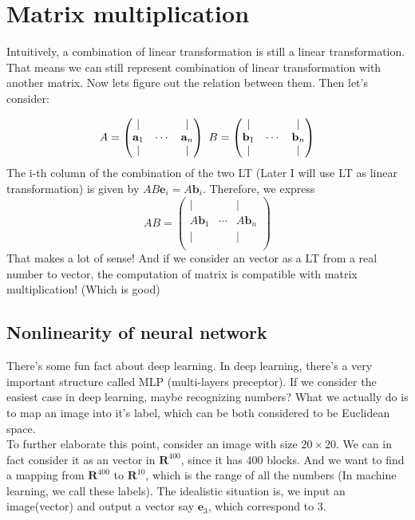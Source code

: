 \section{Matrix multiplication}
Intuitively, a combination of linear transformation is still a linear transformation. That means we can still represent combination of linear transformation with another matrix. Now lets figure out the relation between them. Then let's consider:

$$A = \begin{pmatrix} |& \ & | \\ \mathbf{a}_1& \cdots& \mathbf{a}_n \\ |& \ & | \\ \end{pmatrix}\ B = \begin{pmatrix}
    |& \ & | \\
    \mathbf{b}_1& \cdots& \mathbf{b}_n \\
    |& \ & | \\
\end{pmatrix}$$
The i-th column of the combination of the two LT (Later I will use LT as linear transformation) is given by $AB\mathbf{e}_i = A\mathbf{b}_i$. Therefore, we express $$AB = \begin{pmatrix}
    |& \ & | \\
    A\mathbf{b}_1& \cdots& A\mathbf{b}_n \\
    |& \ & | \\
\end{pmatrix}$$
That makes a lot of sense! And if we consider an vector as a LT from a real number to vector, the computation of matrix is compatible with matrix multiplication! (Which is good)

\subsection{Nonlinearity of neural network}

There's some fun fact about deep learning. In deep learning, there's a very important structure called MLP (multi-layers preceptor). If we consider the easiest case in deep learning, maybe recognizing numbers? What we actually do is to map an image into it's label, which can be both considered to be Euclidean space. \\

To further elaborate this point, consider an image with size $20\times20$. We can in fact consider it as an vector in $\mathbf{R}^{400}$, since it has $400$ blocks. And we want to find a mapping from $\mathbf{R}^{400}$ to $\mathbf{R}^{10}$, which is the range of all the numbers (In machine learning, we call these labels). The idealistic situation is, we input an image(vector) and output a vector say $\mathbf{e}_3$, which correspond to 3.\\

